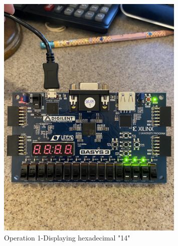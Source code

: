 \documentclass[11pt]{article}
\begin{document}
\begin{figure}[ht]\centering
	\includegraphics[angle=270, width=0.8\textwidth]{step1.jpg}
	\caption{Operation 1-Displaying hexadecimal "14"}
	\label{fig:sim_with_table}
\end{figure}
\clearpage
\end{document}
